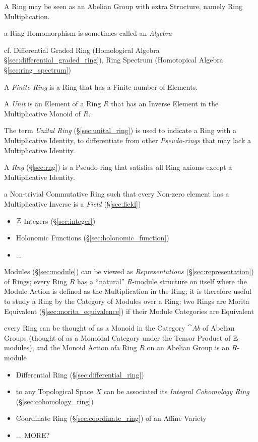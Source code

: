A Ring may be seen as an Abelian Group with extra Structure, namely Ring
Multiplication.

a Ring Homomorphism is sometimes called an \emph{Algebra}

cf. Differential Graded Ring (Homological Algebra
\S\ref{sec:differential_graded_ring}), Ring Spectrum (Homotopical Algebra
\S\ref{sec:ring_spectrum})

A \emph{Finite Ring} is a Ring that has a Finite number of Elements.

A \emph{Unit} is an Element of a Ring $R$ that has an Inverse
Element in the Multiplicative Monoid of $R$.

The term \emph{Unital Ring} (\S\ref{sec:unital_ring}) is used to
indicate a Ring with a Multiplicative Identity, to differentiate from
other \emph{Pseudo-rings} that may lack a Multiplicative Identity.

A \emph{Rng} (\S\ref{sec:rng}) is a Pseudo-ring that satisfies all
Ring axioms except a Multiplicative Identity.

a Non-trivial Commutative Ring such that every Non-zero element has a
Multiplicative Inverse is a \emph{Field} (\S\ref{sec:field})

\begin{itemize}
  \item $\mathbb{Z}$ Integers (\S\ref{sec:integer})
  \item Holonomic Functions (\S\ref{sec:holonomic_function})
  \item ...
\end{itemize}

\fist Modules (\S\ref{sec:module}) can be viewed as \emph{Representations}
(\S\ref{sec:representation}) of Rings; every Ring $R$ has a ``natural''
$R$-module structure on itself where the Module Action is defined as the
Multiplication in the Ring; it is therefore useful to study a Ring by the
Category of Modules over a Ring; two Rings are Morita Equivalent
(\S\ref{sec:morita_equivalence}) if their Module Categories are Equivalent

every Ring can be thought of as a Monoid in the Category $\cat{Ab}$ of Abelian
Groups (thought of as a Monoidal Category under the Tensor Product of
$\mathbb{Z}$-modules), and the Monoid Action ofa Ring $R$ on an Abelian Group is an
$R$-module

\begin{itemize}
  \item Differential Ring (\S\ref{sec:differential_ring})
  \item to any Topological Space $X$ can be associated its \emph{Integral
    Cohomology Ring} (\S\ref{sec:cohomology_ring})
  \item Coordinate Ring (\S\ref{sec:coordinate_ring}) of an Affine Variety
  \item ... MORE?
\end{itemize}

